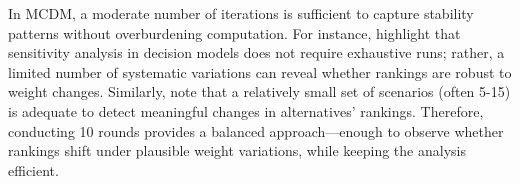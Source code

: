 In MCDM, a moderate number of iterations is sufficient to capture stability patterns without overburdening computation. For instance, \cite{Triantaphyllou1997} highlight that sensitivity analysis in decision models does not require exhaustive runs; rather, a limited number of systematic variations can reveal whether rankings are robust to weight changes. Similarly, \cite{Belton2002} note that a relatively small set of scenarios (often 5-15) is adequate to detect meaningful changes in alternatives' rankings. Therefore, conducting 10 rounds provides a balanced approach—enough to observe whether rankings shift under plausible weight variations, while keeping the analysis efficient.




















